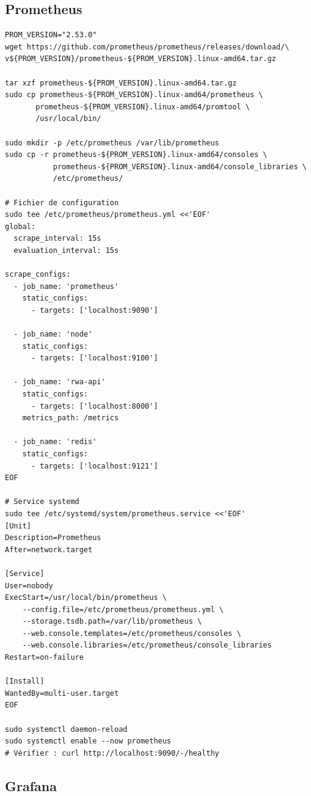 \documentclass[12pt,a4paper,french]{article}
\begin{document}
\subsection{Prometheus}

\begin{lstlisting}[style=bash, caption={Installer Prometheus}]
PROM_VERSION="2.53.0"
wget https://github.com/prometheus/prometheus/releases/download/\
v${PROM_VERSION}/prometheus-${PROM_VERSION}.linux-amd64.tar.gz

tar xzf prometheus-${PROM_VERSION}.linux-amd64.tar.gz
sudo cp prometheus-${PROM_VERSION}.linux-amd64/prometheus \
       prometheus-${PROM_VERSION}.linux-amd64/promtool \
       /usr/local/bin/

sudo mkdir -p /etc/prometheus /var/lib/prometheus
sudo cp -r prometheus-${PROM_VERSION}.linux-amd64/consoles \
           prometheus-${PROM_VERSION}.linux-amd64/console_libraries \
           /etc/prometheus/

# Fichier de configuration
sudo tee /etc/prometheus/prometheus.yml <<'EOF'
global:
  scrape_interval: 15s
  evaluation_interval: 15s

scrape_configs:
  - job_name: 'prometheus'
    static_configs:
      - targets: ['localhost:9090']

  - job_name: 'node'
    static_configs:
      - targets: ['localhost:9100']

  - job_name: 'rwa-api'
    static_configs:
      - targets: ['localhost:8000']
    metrics_path: /metrics

  - job_name: 'redis'
    static_configs:
      - targets: ['localhost:9121']
EOF

# Service systemd
sudo tee /etc/systemd/system/prometheus.service <<'EOF'
[Unit]
Description=Prometheus
After=network.target

[Service]
User=nobody
ExecStart=/usr/local/bin/prometheus \
    --config.file=/etc/prometheus/prometheus.yml \
    --storage.tsdb.path=/var/lib/prometheus \
    --web.console.templates=/etc/prometheus/consoles \
    --web.console.libraries=/etc/prometheus/console_libraries
Restart=on-failure

[Install]
WantedBy=multi-user.target
EOF

sudo systemctl daemon-reload
sudo systemctl enable --now prometheus
# Vérifier : curl http://localhost:9090/-/healthy
\end{lstlisting}

\subsection{Grafana}
\end{document}
